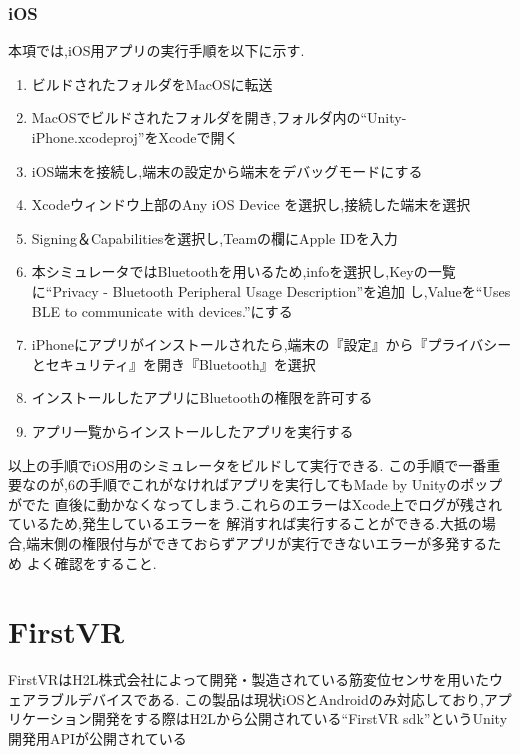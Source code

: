 \documentclass{ltjsreport}
\begin{document}
			\subsubsection{iOS}
				本項では,iOS用アプリの実行手順を以下に示す.
				\begin{enumerate}
					\item ビルドされたフォルダをMacOSに転送
					\item MacOSでビルドされたフォルダを開き,フォルダ内の``Unity-iPhone.xcodeproj''をXcodeで開く
					\item iOS端末を接続し,端末の設定から端末をデバッグモードにする
					\item Xcodeウィンドウ上部のAny iOS Device を選択し,接続した端末を選択
					\item Signing＆Capabilitiesを選択し,Teamの欄にApple IDを入力
					\item 本シミュレータではBluetoothを用いるため,infoを選択し,Keyの一覧に``Privacy - Bluetooth Peripheral Usage Description''を追加
						し,Valueを``Uses BLE to communicate with devices.''にする
					\item iPhoneにアプリがインストールされたら,端末の『設定』から『プライバシーとセキュリティ』を開き『Bluetooth』を選択
					\item インストールしたアプリにBluetoothの権限を許可する
					\item アプリ一覧からインストールしたアプリを実行する
				\end{enumerate}
				以上の手順でiOS用のシミュレータをビルドして実行できる.
				この手順で一番重要なのが,6の手順でこれがなければアプリを実行してもMade by Unityのポップがでた
				直後に動かなくなってしまう.これらのエラーはXcode上でログが残されているため,発生しているエラーを
				解消すれば実行することができる.大抵の場合,端末側の権限付与ができておらずアプリが実行できないエラーが多発するため
				よく確認をすること.
	\section{FirstVR}
		FirstVRはH2L株式会社\cite{ref:6}によって開発・製造されている筋変位センサを用いたウェアラブルデバイスである.
		この製品は現状iOSとAndroidのみ対応しており,アプリケーション開発をする際はH2Lから公開されている``FirstVR sdk''というUnity開発用APIが公開されている
\end{document}
